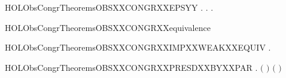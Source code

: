 \begin{SaveVerbatim}{HOLObsCongrTheoremsOBSXXCONGRXXEPSYY}
\HOLTokenTurnstile{} \HOLSymConst{\HOLTokenForall{}} .
          \HOLSymConst{\HOLTokenImp{}}
       \HOLSymConst{\HOLTokenForall{}}.    \HOLSymConst{\HOLTokenImp{}} \HOLSymConst{\HOLTokenExists{}}.    \HOLSymConst{\HOLTokenConj{}}   
\end{SaveVerbatim}
\newcommand{\HOLObsCongrTheoremsOBSXXCONGRXXEPSYY}{\UseVerbatim{HOLObsCongrTheoremsOBSXXCONGRXXEPSYY}}
\begin{SaveVerbatim}{HOLObsCongrTheoremsOBSXXCONGRXXequivalence}
\HOLTokenTurnstile{}  
\end{SaveVerbatim}
\newcommand{\HOLObsCongrTheoremsOBSXXCONGRXXequivalence}{\UseVerbatim{HOLObsCongrTheoremsOBSXXCONGRXXequivalence}}
\begin{SaveVerbatim}{HOLObsCongrTheoremsOBSXXCONGRXXIMPXXWEAKXXEQUIV}
\HOLTokenTurnstile{} \HOLSymConst{\HOLTokenForall{}} .    \HOLSymConst{\HOLTokenImp{}}   
\end{SaveVerbatim}
\newcommand{\HOLObsCongrTheoremsOBSXXCONGRXXIMPXXWEAKXXEQUIV}{\UseVerbatim{HOLObsCongrTheoremsOBSXXCONGRXXIMPXXWEAKXXEQUIV}}
\begin{SaveVerbatim}{HOLObsCongrTheoremsOBSXXCONGRXXPRESDXXBYXXPAR}
\HOLTokenTurnstile{} \HOLSymConst{\HOLTokenForall{}}   .
          \HOLSymConst{\HOLTokenConj{}}    \HOLSymConst{\HOLTokenImp{}}
        \ensuremath{(} \HOLSymConst{\ensuremath{\mid}} \ensuremath{)} \ensuremath{(} \HOLSymConst{\ensuremath{\mid}} \ensuremath{)}
\end{SaveVerbatim}
